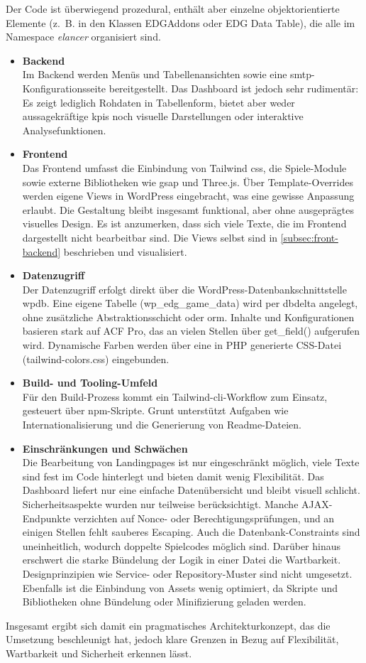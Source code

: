 Der Code ist überwiegend prozedural, enthält aber einzelne objektorientierte Elemente (z.~B. in den Klassen EDGAddons oder EDG Data Table), die alle im Namespace \emph{elancer} organisiert sind.

\begin{itemize}
    \item \textbf{Backend}\\
    Im Backend werden Menüs und Tabellenansichten sowie eine \gls{smtp}-Konfigurationsseite bereitgestellt.
    Das Dashboard ist jedoch sehr rudimentär: Es zeigt lediglich Rohdaten in Tabellenform, bietet aber weder aussagekräftige \gls{kpi}s noch visuelle Darstellungen oder interaktive Analysefunktionen.

    \item \textbf{Frontend}\\
    Das Frontend umfasst die Einbindung von Tailwind \gls{css}, die Spiele-Module sowie externe Bibliotheken wie \gls{gsap} und Three.js.
    Über Template-Overrides werden eigene Views in WordPress eingebracht, was eine gewisse Anpassung erlaubt.
    Die Gestaltung bleibt insgesamt funktional, aber ohne ausgeprägtes visuelles Design.
    Es ist anzumerken, dass sich viele Texte, die im Frontend dargestellt nicht bearbeitbar sind.
    Die Views selbst sind in \ref{subsec:front-backend} beschrieben und visualisiert.

    \item \textbf{Datenzugriff}\\
    Der Datenzugriff erfolgt direkt über die WordPress-Datenbankschnittstelle \gls{wpdb}.
    Eine eigene Tabelle (wp\_edg\_game\_data) wird per \gls{dbdelta} angelegt, ohne zusätzliche Abstraktionsschicht oder \gls{orm}.
    Inhalte und Konfigurationen basieren stark auf ACF Pro, das an vielen Stellen über get\_field() aufgerufen wird.
    Dynamische Farben werden über eine in PHP generierte CSS-Datei (tailwind-colors.css) eingebunden.

    \item \textbf{Build- und Tooling-Umfeld}\\
    Für den Build-Prozess kommt ein Tailwind-\gls{cli}-Workflow zum Einsatz, gesteuert über npm-Skripte.
    Grunt unterstützt Aufgaben wie Internationalisierung und die Generierung von Readme-Dateien.

    \item \textbf{Einschränkungen und Schwächen}\\
    Die Bearbeitung von Landingpages ist nur eingeschränkt möglich, viele Texte sind fest im Code hinterlegt und bieten damit wenig Flexibilität.
    Das Dashboard liefert nur eine einfache Datenübersicht und bleibt visuell schlicht.
    Sicherheitsaspekte wurden nur teilweise berücksichtigt.
    Manche AJAX-Endpunkte verzichten auf Nonce- oder Berechtigungsprüfungen, und an einigen Stellen fehlt sauberes Escaping.
    Auch die Datenbank-Constraints sind uneinheitlich, wodurch doppelte Spielcodes möglich sind.
    Darüber hinaus erschwert die starke Bündelung der Logik in einer Datei die Wartbarkeit.
    Designprinzipien wie Service- oder Repository-Muster sind nicht umgesetzt.
    Ebenfalls ist die Einbindung von Assets wenig optimiert, da Skripte und Bibliotheken ohne Bündelung oder Minifizierung geladen werden.
\end{itemize}
\vspace{0.5em}
Insgesamt ergibt sich damit ein pragmatisches Architekturkonzept, das die Umsetzung beschleunigt hat, jedoch klare Grenzen in Bezug auf Flexibilität, Wartbarkeit und Sicherheit erkennen lässt.